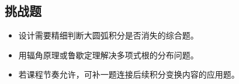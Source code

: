 \subsection*{挑战题}
\begin{itemize}
    \item 设计需要精细判断大圆弧积分是否消失的综合题。
    \item 用辐角原理或鲁歇定理解决多项式根的分布问题。
    \item 若课程节奏允许，可补一题连接后续积分变换内容的应用题。
\end{itemize}
